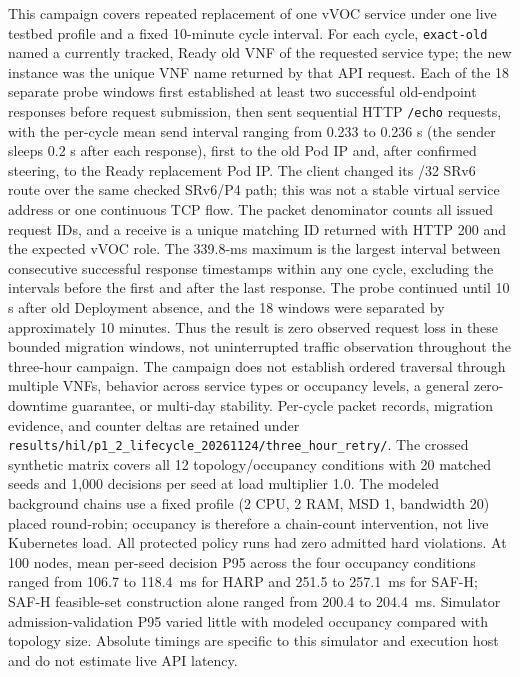 \documentclass[final,5p]{elsarticle}
\newcommand{\rev}[1]{\textcolor{revisiongreen}{#1}}
\let\newrev\rev
\begin{document}
\newrev{This campaign covers repeated replacement of one vVOC service under one live testbed profile and a fixed 10-minute cycle interval. For each cycle, \texttt{exact-old} named a currently tracked, Ready old VNF of the requested service type; the new instance was the unique VNF name returned by that API request. Each of the 18 separate probe windows first established at least two successful old-endpoint responses before request submission, then sent sequential HTTP \texttt{/echo} requests, with the per-cycle mean send interval ranging from 0.233 to 0.236 s (the sender sleeps 0.2 s after each response), first to the old Pod IP and, after confirmed steering, to the Ready replacement Pod IP. The client changed its /32 SRv6 route over the same checked SRv6/P4 path; this was not a stable virtual service address or one continuous TCP flow. The packet denominator counts all issued request IDs, and a receive is a unique matching ID returned with HTTP 200 and the expected vVOC role. The 339.8-ms maximum is the largest interval between consecutive successful response timestamps within any one cycle, excluding the intervals before the first and after the last response. The probe continued until 10 s after old Deployment absence, and the 18 windows were separated by approximately 10 minutes. Thus the result is zero observed request loss in these bounded migration windows, not uninterrupted traffic observation throughout the three-hour campaign. The campaign does not establish ordered traversal through multiple VNFs, behavior across service types or occupancy levels, a general zero-downtime guarantee, or multi-day stability. Per-cycle packet records, migration evidence, and counter deltas are retained under \texttt{results/hil/p1\_2\_lifecycle\_20261124/three\_hour\_retry/}.}
\newrev{The crossed synthetic matrix covers all 12 topology/occupancy conditions with 20 matched seeds and 1,000 decisions per seed at load multiplier 1.0. The modeled background chains use a fixed profile (2 CPU, 2 RAM, MSD 1, bandwidth 20) placed round-robin; occupancy is therefore a chain-count intervention, not live Kubernetes load. All protected policy runs had zero admitted hard violations. At 100 nodes, mean per-seed decision P95 across the four occupancy conditions ranged from 106.7 to 118.4~ms for HARP and 251.5 to 257.1~ms for SAF-H; SAF-H feasible-set construction alone ranged from 200.4 to 204.4~ms. Simulator admission-validation P95 varied little with modeled occupancy compared with topology size. Absolute timings are specific to this simulator and execution host and do not estimate live API latency.}
\end{document}
